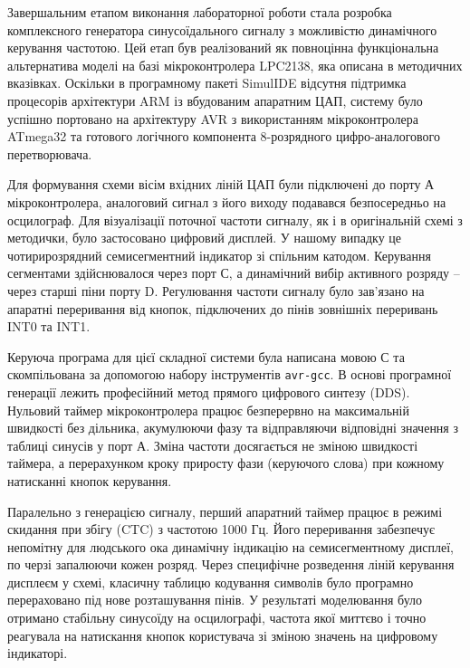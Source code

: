 \documentclass[14pt, a4paper]{extreport}
\begin{document}
	
	Завершальним етапом виконання лабораторної роботи стала розробка комплексного генератора синусоїдального сигналу з можливістю динамічного керування частотою. Цей етап був реалізований як повноцінна функціональна альтернатива моделі на базі мікроконтролера LPC2138, яка описана в методичних вказівках. Оскільки в програмному пакеті SimulIDE відсутня підтримка процесорів архітектури ARM із вбудованим апаратним ЦАП, систему було успішно портовано на архітектуру AVR з використанням мікроконтролера ATmega32 та готового логічного компонента 8-розрядного цифро-аналогового перетворювача.
	
	Для формування схеми вісім вхідних ліній ЦАП були підключені до порту А мікроконтролера, аналоговий сигнал з його виходу подавався безпосередньо на осцилограф. Для візуалізації поточної частоти сигналу, як і в оригінальній схемі з методички, було застосовано цифровий дисплей. У нашому випадку це чотирирозрядний семисегментний індикатор зі спільним катодом. Керування сегментами здійснювалося через порт С, а динамічний вибір активного розряду -- через старші піни порту D. Регулювання частоти сигналу було зав'язано на апаратні переривання від кнопок, підключених до пінів зовнішніх переривань INT0 та INT1.
	
	
	Керуюча програма для цієї складної системи була написана мовою С та скомпільована за допомогою набору інструментів \texttt{avr-gcc}. В основі програмної генерації лежить професійний метод прямого цифрового синтезу (DDS). Нульовий таймер мікроконтролера працює безперервно на максимальній швидкості без дільника, акумулюючи фазу та відправляючи відповідні значення з таблиці синусів у порт А. Зміна частоти досягається не зміною швидкості таймера, а перерахунком кроку приросту фази (керуючого слова) при кожному натисканні кнопок керування.
	
	
	Паралельно з генерацією сигналу, перший апаратний таймер працює в режимі скидання при збігу (CTC) з частотою 1000 Гц. Його переривання забезпечує непомітну для людського ока динамічну індикацію на семисегментному дисплеї, по черзі запалюючи кожен розряд. Через специфічне розведення ліній керування дисплеєм у схемі, класичну таблицю кодування символів було програмно перераховано під нове розташування пінів. У результаті моделювання було отримано стабільну синусоїду на осцилографі, частота якої миттєво і точно реагувала на натискання кнопок користувача зі зміною значень на цифровому індикаторі.
	
\end{document}
